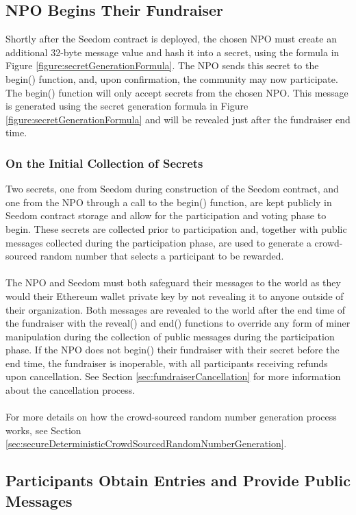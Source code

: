 \documentclass[11pt]{article}
\begin{document}
\subsection{NPO Begins Their Fundraiser}

Shortly after the Seedom contract is deployed, the chosen NPO must create an additional 32-byte message value and hash it into a secret, using the formula in Figure \ref{figure:secretGenerationFormula}. The NPO sends this secret to the begin() function, and, upon confirmation, the community may now participate. The begin() function will only accept secrets from the chosen NPO. This message is generated using the secret generation formula in Figure \ref{figure:secretGenerationFormula} and will be revealed just after the fundraiser end time.

\subsubsection{On the Initial Collection of Secrets}

Two secrets, one from Seedom during construction of the Seedom contract, and one from the NPO through a call to the begin() function, are kept publicly in Seedom contract storage and allow for the participation and voting phase to begin. These secrets are collected prior to participation and, together with public messages collected during the participation phase, are used to generate a crowd-sourced random number that selects a participant to be rewarded.\\\\
The NPO and Seedom must both safeguard their messages to the world as they would their Ethereum wallet private key by not revealing it to anyone outside of their organization. Both messages are revealed to the world after the end time of the fundraiser with the reveal() and end() functions to override any form of miner manipulation during the collection of public messages during the participation phase. If the NPO does not begin() their fundraiser with their secret before the end time, the fundraiser is inoperable, with all participants receiving refunds upon cancellation. See Section \ref{sec:fundraiserCancellation} for more information about the cancellation process.\\\\
For more details on how the crowd-sourced random number generation process works, see Section \ref{sec:secureDeterministicCrowdSourcedRandomNumberGeneration}.

\subsection{Participants Obtain Entries and Provide Public Messages}
\end{document}
